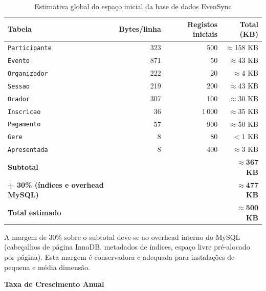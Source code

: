 \documentclass[runningheads]{llncs}
\begin{document}
                \begin{table}[H]
                \centering
                \renewcommand{\arraystretch}{1.3}
                \begin{tabular}{|l|r|r|r|}
                \hline
                \textbf{Tabela} & \textbf{Bytes/linha} & \textbf{Registos iniciais} & \textbf{Total (KB)} \\ \hline
                \texttt{Participante}  & 323  & 500   & $\approx$158 KB \\ \hline
                \texttt{Evento}        & 871  & 50    & $\approx$43 KB \\ \hline
                \texttt{Organizador}   & 222  & 20    & $\approx$4 KB \\ \hline
                \texttt{Sessao}        & 219  & 200   & $\approx$43 KB \\ \hline
                \texttt{Orador}        & 307  & 100   & $\approx$30 KB \\ \hline
                \texttt{Inscricao}     & 36   & 1\,000 & $\approx$35 KB \\ \hline
                \texttt{Pagamento}     & 57   & 900   & $\approx$50 KB \\ \hline
                \texttt{Gere}          & 8    & 80    & $<$1 KB \\ \hline
                \texttt{Apresentada}   & 8    & 400   & $\approx$3 KB \\ \hline
                \textbf{Subtotal}      &      &       & $\approx$\textbf{367 KB} \\ \hline
                \textbf{+ 30\% (índices e overhead MySQL)} & & & $\approx$\textbf{477 KB} \\ \hline
                \textbf{Total estimado} & & & $\approx$\textbf{500 KB} \\ \hline
                \end{tabular}
                \vspace{0.2cm}
                \caption{Estimativa global do espaço inicial da base de dados EvenSync} \label{tab:espaco_bd}
                \end{table}

                A margem de 30\% sobre o subtotal deve-se ao overhead interno do MySQL (cabeçalhos
                de página InnoDB, metadados de índices, espaço livre pré-alocado por página). Esta
                margem é conservadora e adequada para instalações de pequena e média dimensão.

                \vspace{0.4cm}
                \noindent\textbf{Taxa de Crescimento Anual}\\[0.2cm]
\end{document}
